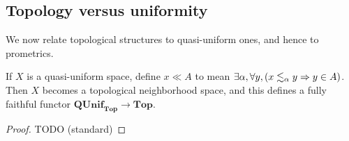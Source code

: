 \documentclass{article}
\def\leapx{\lesssim}
\def\ent#1{\leapx_{#1}}
\let\implies\Rightarrow
\def\Top{\mathbf{Top}}
\def\QUnifTop{\mathbf{QUnif}_{\mathbf{Top}}}
\begin{document}
\subsection{Topology versus uniformity}
\label{sec:top-unif}

We now relate topological structures to quasi-uniform ones, and hence to prometrics.

\begin{thm}\label{thm:unif-top}
  If $X$ is a quasi-uniform space, define $x\ll A$ to mean $\exists \al, \forall y, (x\ent\al y \implies y\in A)$.
  Then $X$ becomes a topological neighborhood space, and this defines a fully faithful functor $\QUnifTop \to \Top$.
\end{thm}
\begin{proof}
  TODO (standard)
\end{proof}
\end{document}
